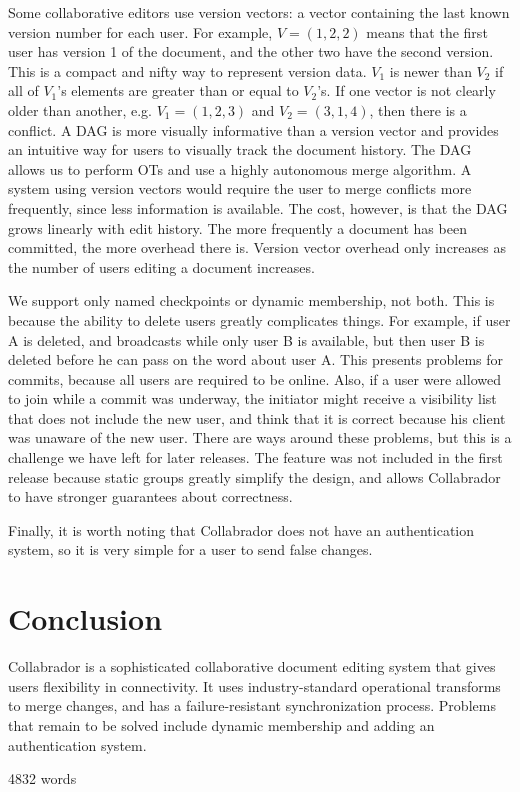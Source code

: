 \documentclass[11pt,titlepage]{article}
\begin{document}
Some collaborative editors use version vectors: a vector containing
the last known version number for each user. For example, \(V = (1, 2,
2)\) means that the first user has version 1 of the document, and the
other two have the second version.  This is a compact and nifty way to
represent version data. \(V_1\) is newer than \(V_2\) if all of
\(V_1\)'s elements are greater than or equal to \(V_2\)'s. If one
vector is not clearly older than another, e.g. \(V_1 = (1,2,3)\) and
\(V_2 = (3,1,4)\), then there is a conflict. A DAG is more visually
informative than a version vector and provides an intuitive way for
users to visually track the document history. The DAG allows us to
perform OTs and use a highly autonomous merge algorithm.  A system
using version vectors would require the user to merge conflicts more
frequently, since less information is available. The cost, however, is
that the DAG grows linearly with edit history. The more frequently a
document has been committed, the more overhead there is. Version
vector overhead only increases as the number of users editing a
document increases.

We support only named checkpoints or dynamic membership, not
both. This is because the ability to delete users greatly complicates
things. For example, if user A is deleted, and broadcasts while only
user B is available, but then user B is deleted before he can pass on
the word about user A. This presents problems for commits, because all
users are required to be online.  Also, if a user were allowed to join
while a commit was underway, the initiator might receive a visibility
list that does not include the new user, and think that it is correct
because his client was unaware of the new user.  There are ways around
these problems, but this is a challenge we have left for later
releases. The feature was not included in the first release because
static groups greatly simplify the design, and allows Collabrador to 
have stronger guarantees about correctness.

Finally, it is worth noting that Collabrador does not have an
authentication system, so it is very simple for a user to send false
changes.

\section{Conclusion}

Collabrador is a sophisticated collaborative document editing system
that gives users flexibility in connectivity. It uses
industry-standard operational transforms to merge changes, and has a
failure-resistant synchronization process.  Problems that remain to be
solved include dynamic membership and adding an authentication system.

 

4832 words
\end{document}
